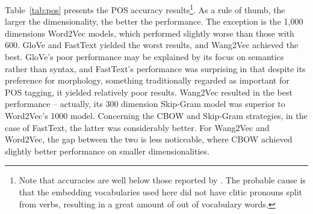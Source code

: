     Table~\ref{tab:pos} presents the POS accuracy results\footnote{Note that accuracies are well below those reported by \cite{Fonseca2015}. The probable cause is that the embedding vocabularies used here did not have clitic pronouns split from verbs, resulting in a great amount of out of vocabulary words.}.  As a rule of thumb, the larger the dimensionality, the better the performance. The exception is the 1,000 dimensions Word2Vec models, which performed slightly worse than those with 600. GloVe and FastText yielded the worst results, and Wang2Vec achieved the best. GloVe's poor performance may be explained by its focus on semantics rather than syntax, and FastText's performance was surprising in that despite its preference for morphology, something traditionally regarded as important for POS tagging, it yielded relatively poor results. Wang2Vec resulted in the best performance -- actually, its 300 dimension Skip-Gram model was superior to Word2Vec's 1000 model. Concerning the CBOW and Skip-Gram strategies, in the case of FastText, the latter was considerably better. For Wang2Vec and Word2Vec, the gap between the two is less noticeable, where CBOW achieved slightly better performance on smaller dimensionalities. 

